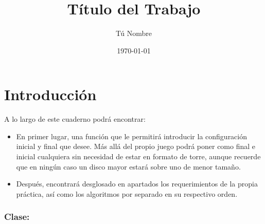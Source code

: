 \documentclass{article}
\title{Título del Trabajo}
\author{Tú Nombre}
\date{\today}
\begin{document}
\maketitle

\newpage
\thispagestyle{empty}
\mbox{}

\setcounter{page}{1}

\section{Introducción}
A lo largo de este cuaderno podrá encontrar:
\begin{itemize}
    \item En primer lugar, una función que le permitirá introducir la configuración inicial y final que desee. Más allá del propio juego podrá poner como final e inicial cualquiera sin necesidad de estar en formato de torre, aunque recuerde que en ningún caso un disco mayor estará sobre uno de menor tamaño.
    \item Después, encontrará desglosado en apartados los requerimientos de la propia práctica, así como los algoritmos por separado en su respectivo orden.
\end{itemize}


\subsubsection*{Clase:}
\end{document}
